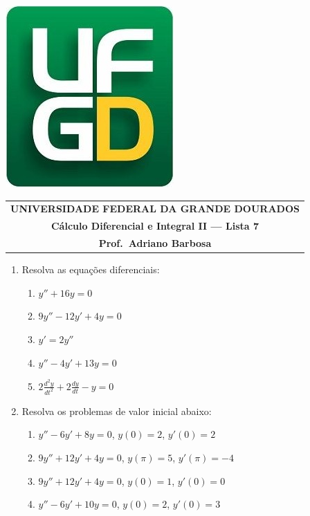 \documentclass[a4paper,5pt]{amsbook}
\newcommand{\ds}{\displaystyle}
\begin{document}
\thispagestyle{empty}
\pagestyle{empty}
\begin{minipage}[h]{0.14\textwidth}
	\includegraphics[scale=0.24]{../../ufgd.png}
\end{minipage}
\begin{minipage}[h]{\textwidth}
\begin{tabular}{c}
{{\bf UNIVERSIDADE FEDERAL DA GRANDE DOURADOS}}\\
{{\bf C\'{a}lculo Diferencial e Integral II --- Lista 7}}\\
{{\bf Prof.\ Adriano Barbosa}}\\
\end{tabular}
\vspace{-0.45cm}
%
\end{minipage}


\vspace{1cm}
\begin{enumerate}
	\vspace{0.5cm}
    \item Resolva as equa\c{c}\~oes diferenciais:
        \begin{enumerate}
            \setlength\itemsep{0.2cm}
            \item $y'' +16y=0$
            \item $9y''-12y'+4y=0$
            \item $y'=2y''$
            \item $y''-4y'+13y=0$
            \item $2\ds\frac{d^2y}{dt^2}+2\ds\frac{dy}{dt}-y=0$
        \end{enumerate}

    \vspace{0.5cm}
    \item Resolva os problemas de valor inicial abaixo:
        \begin{enumerate}
            \setlength\itemsep{0.2cm}
            \item $y''-6y'+8y=0$, $y(0)=2$, $y'(0)=2$
            \item $9y''+12y'+4y=0$, $y(\pi)=5$, $y'(\pi)=-4$
            \item $9y''+12y'+4y=0$, $y(0)=1$, $y'(0)=0$
            \item $y''-6y'+10y=0$, $y(0)=2$, $y'(0)=3$
        \end{enumerate}
\end{enumerate}
\end{document}
